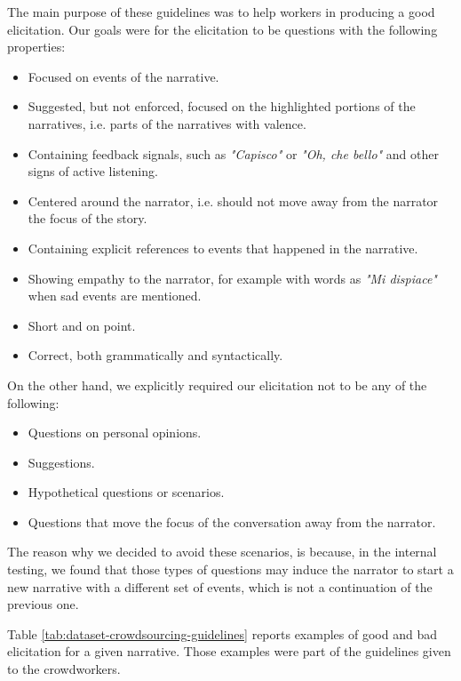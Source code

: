 The main purpose of these guidelines was to help workers in producing a good elicitation. Our goals were for the elicitation to be questions with the following properties:
\begin{itemize}
    \item Focused on events of the narrative.
    \item Suggested, but not enforced, focused on the highlighted portions of the narratives, i.e. parts of the narratives with valence.
    \item Containing feedback signals, such as \emph{"Capisco"} or \emph{"Oh, che bello"} and other signs of active listening.
    \item Centered around the narrator, i.e. should not move away from the narrator the focus of the story.
    \item Containing explicit references to events that happened in the narrative.
    \item Showing empathy to the narrator, for example with words as \emph{"Mi dispiace"} when sad events are mentioned.
    \item Short and on point.
    \item Correct, both grammatically and syntactically.
\end{itemize}
On the other hand, we explicitly required our elicitation not to be any of the following:
\begin{itemize}
    \item Questions on personal opinions.
    \item Suggestions.
    \item Hypothetical questions or scenarios.
    \item Questions that move the focus of the conversation away from the narrator.
\end{itemize}
The reason why we decided to avoid these scenarios, is because, in the internal testing, we found that those types of questions may induce the narrator to start a new narrative with a different set of events, which is not a continuation of the previous one. 

Table \ref{tab:dataset-crowdsourcing-guidelines} reports examples of good and bad elicitation for a given narrative. Those examples were part of the guidelines given to the crowdworkers.
